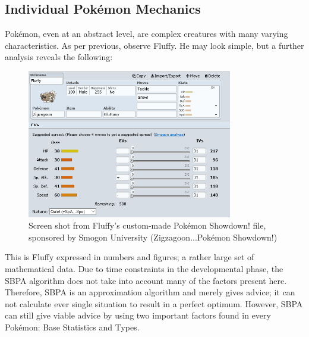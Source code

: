 \documentclass{article}
\begin{document}
\subsection{Individual Pok\'emon Mechanics}
Pok\'emon, even at an abstract level, are complex creatures with many varying characteristics. As per previous, observe Fluffy. He may look simple, but a further analysis reveals the following:
\begin{figure}[H]
	\includegraphics[width=0.8\textwidth]{fluffyfile.png}
	\centering
	\caption{Screen shot from Fluffy's custom-made Pok\'emon Showdown! file, sponsored by Smogon University (Zigzagoon...Pok\'emon Showdown!)}
\end{figure}
This is Fluffy expressed in numbers and figures; a rather large set of mathematical data. Due to time constraints in the developmental phase, the SBPA algorithm does not take into account many of the factors present here. Therefore, SBPA is an approximation algorithm and merely gives advice; it can not calculate ever single situation to result in a perfect optimum. However, SBPA can still give viable advice by using two important factors found in every Pok\'emon: Base Statistics and Types.
\end{document}
